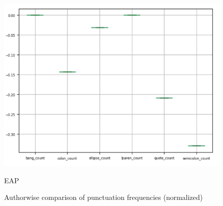 \documentclass[8pt]{article}
\begin{document}
\begin{figure}[h]
\begin{multicols}{3}
      \includegraphics[width=\linewidth]{images/punc_eap.png}\par\caption{EAP}
  \end{multicols} 

  \caption{Authorwise comparison of punctuation frequencies (normalized)}
  \label{fig:punc}
\end{figure}
\end{document}
